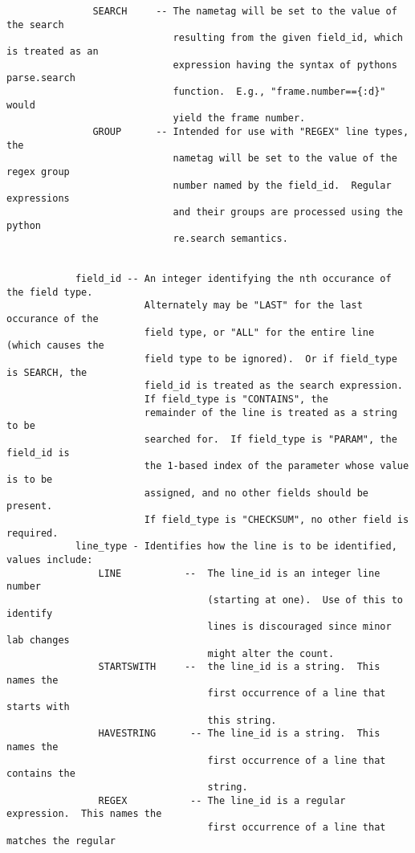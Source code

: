 \documentclass[12pt]{article}
\begin{document}
\begin{verbatim}
               SEARCH     -- The nametag will be set to the value of the search 
                             resulting from the given field_id, which is treated as an
                             expression having the syntax of pythons parse.search 
                             function.  E.g., "frame.number=={:d}" would 
                             yield the frame number.
               GROUP      -- Intended for use with "REGEX" line types, the 
                             nametag will be set to the value of the regex group 
                             number named by the field_id.  Regular expressions
                             and their groups are processed using the python
                             re.search semantics.
                             
                              
            field_id -- An integer identifying the nth occurance of the field type.
                        Alternately may be "LAST" for the last occurance of the 
                        field type, or "ALL" for the entire line (which causes the 
                        field type to be ignored).  Or if field_type is SEARCH, the
                        field_id is treated as the search expression. 
                        If field_type is "CONTAINS", the 
                        remainder of the line is treated as a string to be 
                        searched for.  If field_type is "PARAM", the field_id is
                        the 1-based index of the parameter whose value is to be 
                        assigned, and no other fields should be present.
                        If field_type is "CHECKSUM", no other field is required.
            line_type - Identifies how the line is to be identified, values include:
                LINE           --  The line_id is an integer line number 
                                   (starting at one).  Use of this to identify 
                                   lines is discouraged since minor lab changes 
                                   might alter the count.
                STARTSWITH     --  the line_id is a string.  This names the 
                                   first occurrence of a line that starts with 
                                   this string. 
                HAVESTRING      -- The line_id is a string.  This names the 
                                   first occurrence of a line that contains the 
                                   string.
                REGEX           -- The line_id is a regular expression.  This names the 
                                   first occurrence of a line that matches the regular

\end{verbatim}
\end{document}

